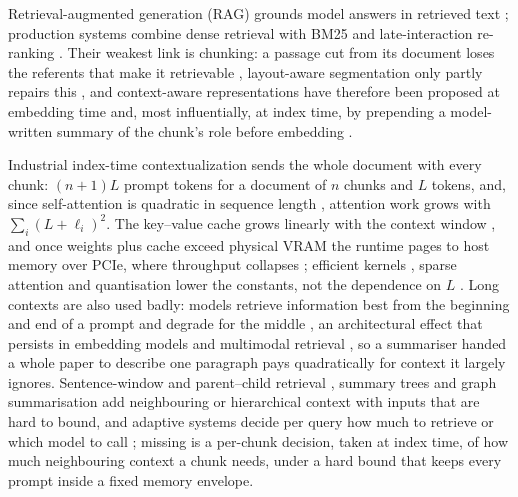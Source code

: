 \documentclass[pdflatex,sn-mathphys-num]{sn-jnl}
\theoremstyle{thmstyleone}%
\theoremstyle{thmstylethree}%
\begin{document}
Retrieval-augmented generation (RAG) grounds model answers in retrieved text \cite{lewisetal2021,info16090766,ram2023incontext}; production systems combine dense retrieval \cite{karpukhin2020dpr} with BM25 \cite{robertson1995okapi,robertson2009bm25} and late-interaction re-ranking \cite{khattab2020colbert,santhanam2022colbertv2,kiran2025hybrid,wang2024searching}. Their weakest link is chunking: a passage cut from its document loses the referents that make it retrievable \cite{merola2025reconstructingcontextevaluatingadvanced,smith2024evaluating,qu2024semanticchunkingworthcomputational,chen2023densex}, layout-aware segmentation only partly repairs this \cite{auer2024doclingtechnicalreport,verma2025s2chunkinghybridframework}, and context-aware representations have therefore been proposed at embedding time \cite{gunther2024latechunking} and, most influentially, at index time, by prepending a model-written summary of the chunk's role before embedding \cite{anthropic2024contextual}.

Industrial index-time contextualization sends the whole document with every chunk: $(n+1)L$ prompt tokens for a document of $n$ chunks and $L$ tokens, and, since self-attention is quadratic in sequence length \cite{vaswani2017attention,tay2022efficient,kaplan2020scaling}, attention work grows with $\sum_i (L+\ell_i)^2$. The key--value cache grows linearly with the context window \cite{pope2023efficiently,kwon2023vllm,ainslie2023gqa}, and once weights plus cache exceed physical VRAM the runtime pages to host memory over PCIe, where throughput collapses \cite{sheng2023flexgen}; efficient kernels \cite{dao2022flashattention}, sparse attention \cite{beltagy2020longformer} and quantisation \cite{jacob2018quantization} lower the constants, not the dependence on $L$ \cite{shen2024RAGDesignTradeoffs,zhao2025RAGDesignDecisions,samsi2023words}. Long contexts are also used badly: models retrieve information best from the beginning and end of a prompt and degrade for the middle \cite{liu2023lostmiddlelanguagemodels}, an architectural effect \cite{guo2024serialpositioneffectslarge,menschikov2025earlytokenbiasmodelspecificlanguagespecific,hsieh2024found} that persists in embedding models \cite{lee2025quantifyingpositionalbiasestext} and multimodal retrieval \cite{yao2025spotlighthiddenbiasundermining}, so a summariser handed a whole paper to describe one paragraph pays quadratically for context it largely ignores. Sentence-window and parent--child retrieval \cite{gao2024retrievalaugmentedgenerationlargelanguage, Liu_LlamaIndex_2022}, summary trees \cite{sarthi2024raptorrecursiveabstractiveprocessing} and graph summarisation \cite{edge2024graphrag} add neighbouring or hierarchical context with inputs that are hard to bound, and adaptive systems decide per query how much to retrieve \cite{jeong2024adaptiverag,asai2024selfrag} or which model to call \cite{ong2024routellm,chen2023frugalgpt}; missing is a per-chunk decision, taken at index time, of how much neighbouring context a chunk needs, under a hard bound that keeps every prompt inside a fixed memory envelope.
\end{document}
